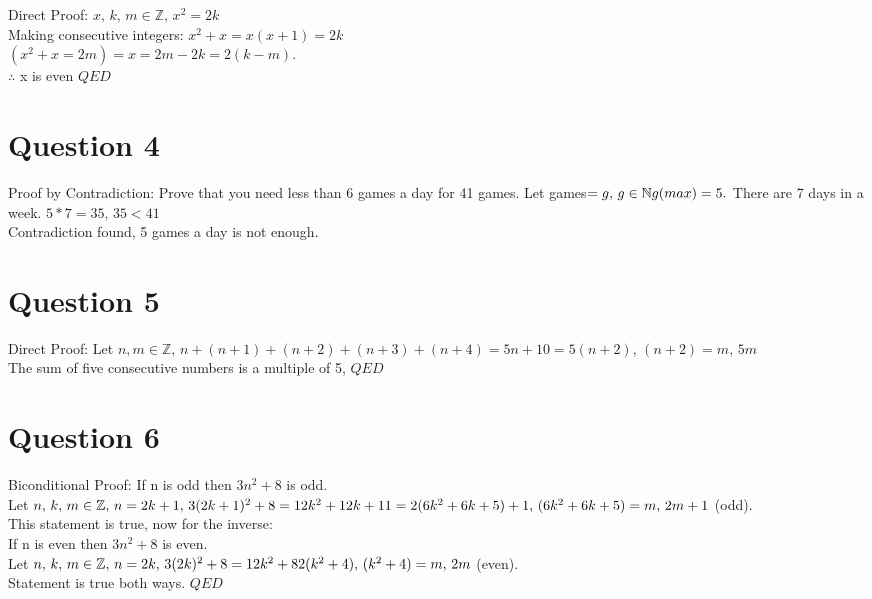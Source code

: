 \documentclass[a4paper,12pt]{article}
\begin{document}
Direct Proof: $x,\,k,\,m \in \mathbb{Z},\, x^2 = 2k$ \\ 
Making consecutive integers: $x^2 + x = x(x+1) = 2k$ \\ 
$(x^2 + x = 2m) = x = 2m - 2k = 2(k - m).$ \\ 
$\therefore$ x is even $QED$

\section{Question 4}
\label{sec6}

Proof by Contradiction: Prove that you need less than 6 games a day for 41 games. Let games$ = g,\,g \in \mathbb{N} \\
g(max) = 5.$ There are 7 days in a week. $5*7 = 35,\,35 < 41$ \\
Contradiction found, 5 games a day is not enough.
  
\section{Question 5}
\label{sec7}

Direct Proof: Let $n,m \in \mathbb{Z},\, n + (n+1) + (n+2) + (n+3) + (n+4) = 5n+10 = 5(n+2),\,(n+2) = m,\,5m$\\
The sum of five consecutive numbers is a multiple of 5, $QED$

\section{Question 6}
\label{sec8}

Biconditional Proof: If n is odd then $3n^2 + 8$ is odd.\\ 
Let $n,\,k,\,m \in \mathbb{Z},\,n = 2k+1,\,3(2k+1)^2+8 = 12k^2 + 12k + 11 \\
= 2(6k^2 + 6k + 5) +1,\,(6k^2 + 6k + 5) = m,\,2m+1$ (odd). \\ 
This statement is true, now for the inverse: \\ 
If n is even then $3n^2 + 8$ is even. \\ 
Let $n,\,k,\,m \in \mathbb{Z},\,n = 2k,\,3(2k)^2+8 = 12k^2 + 8 \\
2(k^2 + 4),\,(k^2 + 4) = m,\, 2m$ (even). \\ 
Statement is true both ways. $QED$
\end{document}
